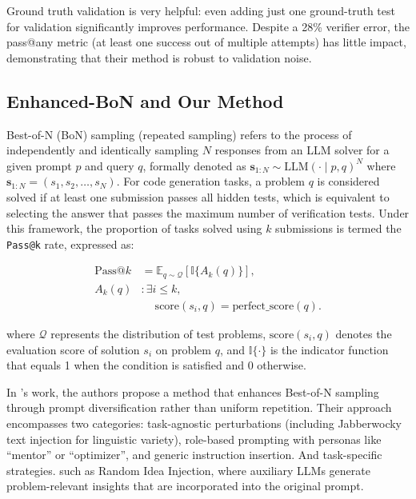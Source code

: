 \documentclass[11pt]{article}
\theoremstyle{definition}
\theoremstyle{remark}
\begin{document}
Ground truth validation is very helpful: even adding just one ground-truth test for validation significantly improves performance. Despite a 28\% verifier error, the pass@any metric (at least one success out of multiple attempts) has little impact, demonstrating that their method is robust to validation noise.



\subsection{Enhanced-BoN and Our Method}
\label{apps:bon}
Best-of-N (BoN) sampling (repeated sampling) refers to the process of independently and identically sampling $N$ responses from an LLM solver for a given prompt $p$ and query $q$, formally denoted as $\boldsymbol{s}_{1:N} \sim \text{LLM}(\cdot \mid p, q)^N$ where $\boldsymbol{s}_{1:N} = (s_1, s_2, \ldots, s_N)$. For code generation tasks, a problem $q$ is considered solved if at least one submission passes all hidden tests, which is equivalent to selecting the answer that passes the maximum number of verification tests. Under this framework, the proportion of tasks solved using $k$ submissions is termed the \texttt{Pass@k} rate, expressed as:

\begin{equation}
\begin{aligned}
\text{Pass@}k
&= \mathbb{E}_{q \sim \mathcal{Q}}
   \left[\mathbb{I}\{A_k(q)\}\right],\\
A_k(q)
&: \exists i \le k,\ \\
&\quad\ \text{score}(s_i,q)=\text{perfect\_score}(q).
\end{aligned}
\end{equation}

where $\mathcal{Q}$ represents the distribution of test problems, $\text{score}(s_i, q)$ denotes the evaluation score of solution $s_i$ on problem $q$, and $\mathbb{I}\{\cdot\}$ is the indicator function that equals 1 when the condition is satisfied and 0 otherwise.

In \cite{wang2025diversified}'s work, the authors propose a method that enhances Best-of-N sampling through prompt diversification rather than uniform repetition. Their approach encompasses two categories: task-agnostic perturbations (including Jabberwocky text injection for linguistic variety), role-based prompting with personas like ``mentor'' or ``optimizer'', and generic instruction insertion. And task-specific strategies. such as Random Idea Injection, where auxiliary LLMs generate problem-relevant insights that are incorporated into the original prompt. 
\end{document}
